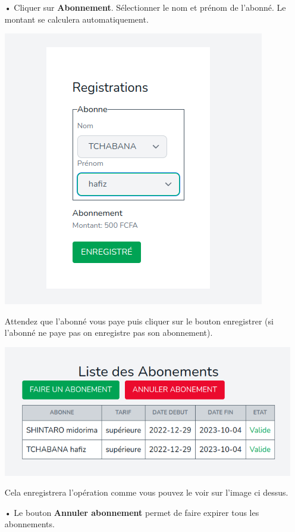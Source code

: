 \documentclass[12pt,a4paper]{article}
\begin{document}
\begin{itemize}
\item[•]  Cliquer sur \textbf{Abonnement}.
Sélectionner le nom et prénom de l'abonné. Le montant se calculera automatiquement.
\begin{center}
\includegraphics[scale=0.56]{img/abonnement_create.png}
\end{center}
Attendez que l'abonné vous paye puis cliquer sur le bouton enregistrer (si l'abonné ne paye pas on enregistre
pas son abonnement).\\
\begin{center}
\includegraphics[scale=0.56]{img/abonnements1.png}
\end{center}
Cela enregistrera l'opération comme vous pouvez le voir sur l'image ci dessus.
\item[•] Le bouton \textbf{Annuler abonnement} permet de faire expirer tous les abonnements.

\end{itemize}
\end{document}
